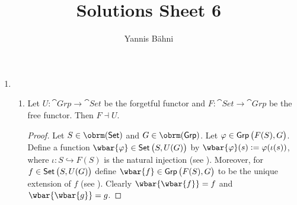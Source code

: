 

\title{Solutions Sheet 6}
\author{Yannis B\"{a}hni}
\address[Yannis B\"{a}hni]{University of Zurich, R\"{a}mistrasse 71, 8006 Zurich}


\maketitle
\thispagestyle{fancy}
\setcounter{section}{1}

\begin{enumerate}[label = \textbf{Exercise \arabic*.},wide = 0pt, itemsep=1.5ex]
	\item 
		~
		\begin{enumerate}[label = (\alph*)]
			\item 
				\begin{lemma}
					Let $U : \cat{Grp} \to \cat{Set}$ be the forgetful functor and $F : \cat{Set} \to \cat{Grp}$ be the free functor. Then $F \dashv U$.
				\end{lemma}

				\begin{proof}
					Let $S \in \obrm(\cat{Set})$ and $G \in \obrm(\cat{Grp})$. Let $\varphi \in \cat{Grp}\del[1]{F(S),G}$. Define a function $\wbar{\varphi} \in \cat{Set}\del[1]{S,U(G)}$ by $\wbar{\varphi}(s) := \varphi(\iota(s))$, where $\iota : S \hookrightarrow F(S)$ is the natural injection (see \cite[240]{lee:topological_manifolds:2011}). Moreover, for $f \in \cat{Set}\del[1]{S,U(G)}$ define $\wbar{f} \in \cat{Grp}\del[1]{F(S),G}$ to be the unique extension of $f$ (see \cite[240]{lee:topological_manifolds:2011}). Clearly $\wbar{\wbar{f}} = f$ and $\wbar{\wbar{g}} = g$.
				\end{proof}
		\end{enumerate}
\end{enumerate}
\printbibliography

